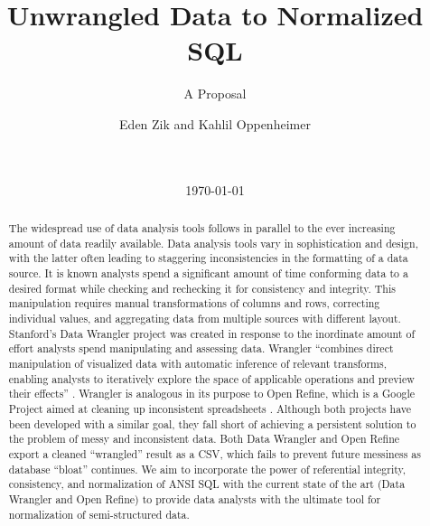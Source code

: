 \documentclass{../sty/acm_proc_article-sp}
\begin{document}
\title{Unwrangled Data to Normalized SQL}
\subtitle{A Proposal}

\author{
\alignauthor
Eden Zik and Kahlil Oppenheimer\\
       \\
       \\
}

\date{\today}


\maketitle

\begin{abstract}

The widespread use of data analysis tools follows in parallel to the ever increasing amount of data readily available. Data analysis tools vary in sophistication and design, with the latter often leading to staggering inconsistencies in the formatting of a data source. It is known analysts spend a significant amount of time conforming data to a desired format while checking and rechecking it for consistency and integrity. This manipulation requires manual transformations of columns and rows, correcting individual values, and aggregating data from multiple sources with different layout. Stanford's Data Wrangler project was created in response to the inordinate amount of effort analysts spend manipulating and assessing data. Wrangler ``combines direct manipulation of visualized data with automatic inference of relevant transforms, enabling analysts to iteratively explore the space of applicable operations and preview their effects'' \cite{2011-wrangler}. Wrangler is analogous in its purpose to Open Refine, which is a Google Project aimed at cleaning up inconsistent spreadsheets \cite{Refine}. Although both projects have been developed with a similar goal, they fall short of achieving a persistent solution to the problem of messy and inconsistent data. Both Data Wrangler and Open Refine export a cleaned ``wrangled'' result as a CSV, which fails to prevent future messiness as database ``bloat'' continues. We aim to incorporate the power of referential integrity, consistency, and normalization of ANSI SQL with the current state of the art (Data Wrangler and Open Refine) to provide data analysts with the ultimate tool for normalization of semi-structured data.
\end{abstract}
\end{document}
